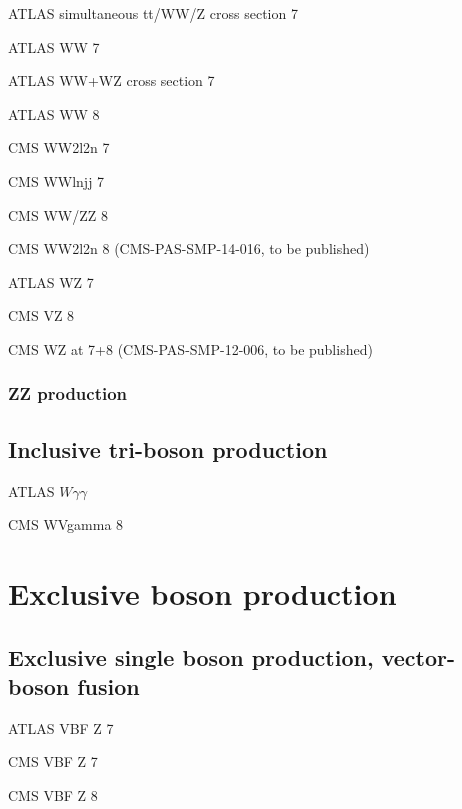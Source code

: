 \documentclass[12pt]{iopart}
\begin{document}
ATLAS simultaneous tt/WW/Z cross section 7 \TeV~\cite{Aad:2014jra}

ATLAS WW 7 \TeV~\cite{ATLAS:2012mec}

ATLAS WW+WZ cross section 7 \TeV~\cite{Aad:2014mda}

ATLAS WW 8 \TeV~\cite{ATLAS-CONF-2014-033}

CMS WW2l2n 7 \TeV~\cite{Chatrchyan:2013yaa}

CMS WWlnjj 7 \TeV~\cite{Chatrchyan:2012bd}

CMS WW/ZZ 8 \TeV~\cite{Chatrchyan:2013oev}

CMS WW2l2n 8 \TeV (CMS-PAS-SMP-14-016, to be published)


ATLAS WZ 7 \TeV~\cite{Aad:2012twa}

CMS VZ 8 \TeV~\cite{Chatrchyan:2014aqa}

CMS WZ at 7+8 \TeV (CMS-PAS-SMP-12-006, to be published)

\subsubsection{ZZ production}
\label{sss-ZZprod}








\subsection{Inclusive tri-boson production}

ATLAS $W\gamma\gamma$~\cite{Aad:2015uqa}

CMS WVgamma 8 \TeV~\cite{Chatrchyan:2014bza}

\section{Exclusive boson production}
\subsection{Exclusive single boson production, vector-boson fusion}

ATLAS VBF Z 7 \TeV~\cite{Aad:2014dta}

CMS VBF Z 7 \TeV~\cite{Chatrchyan:2013jya}

CMS VBF Z 8 \TeV~\cite{Khachatryan:2014dea}
\end{document}
